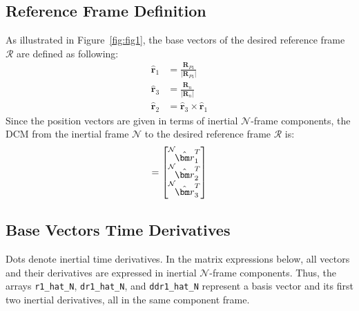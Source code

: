 \subsection{Reference Frame Definition}
As illustrated in Figure~\ref{fig:fig1}, the base vectors of the desired reference frame $\mathcal{R}$  are defined as following:
\begin{subequations}
	\begin{align}
		\hat{\bm r}_{1} &= \frac{{\bm R}_{P1}} {|{\bm R}_{P1}|} \\
		\hat{\bm r}_{3} &= \frac{{\bm R}_{n}}{|{\bm R}_{n}|} \\
		\hat{\bm r}_{2} &=  \hat{\bm r}_{3} \times \hat{\bm r}_{1}
	\end{align}
\end{subequations}
Since the position vectors are given in terms of inertial $\mathcal{N}$-frame components, the DCM from the inertial frame $\mathcal{N}$ to the desired reference frame $\mathcal{R}$ is:
\begin{equation}
	[RN] = \begin{bmatrix}
		\leftexp{N}{ \hat{\bm r}_{1}^{T} } \\
		\leftexp{N}{ \hat{\bm r}_{2}^{T} }  \\
		\leftexp{N}{ \hat{\bm r}_{3}^{T} }
	\end{bmatrix}
\end{equation}
\subsection{Base Vectors Time Derivatives}
Dots denote inertial time derivatives. In the matrix expressions below, all vectors and their derivatives are expressed in inertial $\mathcal{N}$-frame components. Thus, the arrays \texttt{r1\_hat\_N}, \texttt{dr1\_hat\_N}, and \texttt{ddr1\_hat\_N} represent a basis vector and its first two inertial derivatives, all in the same component frame.

